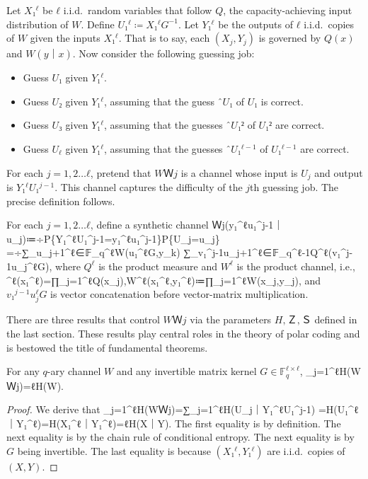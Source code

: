 \documentclass[openany]{amsbook}
\numberwithin{equation}{chapter}
\numberwithin{figure}{chapter}
\numberwithin{table}{chapter}
\def\[#1\]{\begin{equation*}{#1}\end{equation*}}
\theoremstyle{definition}	理dfn:Definition~?s			理exa:Example~?s
\theoremstyle{remark}		理cla:Claim~?s				理rem:Remark~?s
\begin{document}
	Let $X₁^ℓ$ be $ℓ$ i.i.d.\ random variables that follow $Q$,
	the capacity-achieving input distribution of $W$.
	Define $U₁^ℓ≔X₁^ℓG^{-1}$.
	Let $Y₁^ℓ$ be the outputs of $ℓ$ i.i.d.\ copies of $W$ given the inputs $X₁^ℓ$.
	That is to say, each $(X_j,Y_j)$ is governed by $Q(x)$ and $W(y｜x)$.
	Now consider the following guessing job:
	\begin{itemize}
		\item	Guess $U₁$ given $Y₁^ℓ$.
		\item	Guess $U₂$ given $Y₁^ℓ$,
				assuming that the guess $ˆU₁$ of $U₁$ is correct.
		\item	Guess $U₃$ given $Y₁^ℓ$,
				assuming that the guesses $ˆU₁²$ of $U₁²$ are correct.
				\[⋮\]
		\item	Guess $U_ℓ$ given $Y₁^ℓ$,
				assuming that the guesses $ˆU₁^{ℓ-1}$ of $U₁^{ℓ-1}$ are correct.
	\end{itemize}
	For each $j=1,2…ℓ$, pretend that $WＷj$ is a channel
	whose input is $U_j$ and output is $Y₁^ℓU₁^{j-1}$.
	This channel captures the difficulty of the $j$th guessing job.
	The precise definition follows.
	
	\begin{dfn}
		For each $j=1,2…ℓ$, define a synthetic channel
		\[WＷj(y₁^ℓu₁^{j-1}｜u_j)≔÷{P\{Y₁^ℓU₁^{j-1}=y₁^ℓu₁^{j-1}\}}{P\{U_j=u_j\}}
			=÷{∑\limits_{u_{j+1}^ℓ∈𝔽_q^ℓ}W(u₁^ℓG,y_k)}
				{∑\limits_{v₁^{j-1}u_{j+1}^ℓ∈𝔽_q^{ℓ-1}}Q^ℓ(v₁^{j-1}u_j^ℓG)},\]
		where $Q^ℓ$ is the product measure and $W^ℓ$ is the product channel, i.e.,
		\[Q^ℓ(x₁^ℓ)=∏_{j=1}^ℓQ(x_j),\qquad W^ℓ(x₁^ℓ,y₁^ℓ)≔∏_{j=1}^ℓW(x_j,y_j),\]
		and $v₁^{j-1}u_j^ℓG$ is vector concatenation
		before vector-matrix multiplication.
	\end{dfn}
	
	There are three results that control $WＷj$ via
	the parameters $H,Ｚ,Ｓ$ defined in the last section.
	These results play central roles in the theory of polar coding
	and is bestowed the title of fundamental theorems.
	
	\begin{thm}
		\label{thm:ftpcH}
		For any $q$-ary channel $W$ and any invertible matrix kernel $G∈𝔽_q^{ℓ×ℓ}$,
		\[∑_{j=1}^ℓH(WＷj)=ℓH(W).\]
	\end{thm}
	
	\begin{proof}
		We derive that
		\[∑_{j=1}^ℓH(WＷj)=∑_{j=1}^ℓH(U_j｜Y₁^ℓU₁^{j-1})
			=H(U₁^ℓ｜Y₁^ℓ)=H(X₁^ℓ｜Y₁^ℓ)=ℓH(X｜Y).\]
		The first equality is by definition.
		The next equality is by the chain rule of conditional entropy.
		The next equality is by $G$ being invertible.
		The last equality is because $(X₁^ℓ,Y₁^ℓ)$ are i.i.d.\ copies of $(X,Y)$.
	\end{proof}
	
\end{document}
